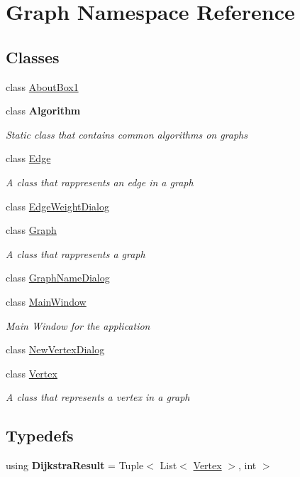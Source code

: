 \hypertarget{namespace_graph}{}\section{Graph Namespace Reference}
\label{namespace_graph}
\subsection*{Classes}
\begin{DoxyCompactItemize}
\item 
class \hyperlink{class_graph_1_1_about_box1}{About\+Box1}
\item 
class {\bfseries Algorithm}
\begin{DoxyCompactList}\small\item\em Static class that contains common algorithms on graphs \end{DoxyCompactList}\item 
class \hyperlink{class_graph_1_1_edge}{Edge}
\begin{DoxyCompactList}\small\item\em A class that rappresents an edge in a graph \end{DoxyCompactList}\item 
class \hyperlink{class_graph_1_1_edge_weight_dialog}{Edge\+Weight\+Dialog}
\item 
class \hyperlink{class_graph_1_1_graph}{Graph}
\begin{DoxyCompactList}\small\item\em A class that rappresents a graph \end{DoxyCompactList}\item 
class \hyperlink{class_graph_1_1_graph_name_dialog}{Graph\+Name\+Dialog}
\item 
class \hyperlink{class_graph_1_1_main_window}{Main\+Window}
\begin{DoxyCompactList}\small\item\em Main Window for the application \end{DoxyCompactList}\item 
class \hyperlink{class_graph_1_1_new_vertex_dialog}{New\+Vertex\+Dialog}
\item 
class \hyperlink{class_graph_1_1_vertex}{Vertex}
\begin{DoxyCompactList}\small\item\em A class that represents a vertex in a graph \end{DoxyCompactList}\end{DoxyCompactItemize}
\subsection*{Typedefs}
\begin{DoxyCompactItemize}
\item 
\mbox{\label{namespace_graph_aaa1a0c11dafb790d64f39be3bff79717}} 
using {\bfseries Dijkstra\+Result} = Tuple$<$ List$<$ \hyperlink{class_graph_1_1_vertex}{Vertex} $>$, int $>$
\end{DoxyCompactItemize}
